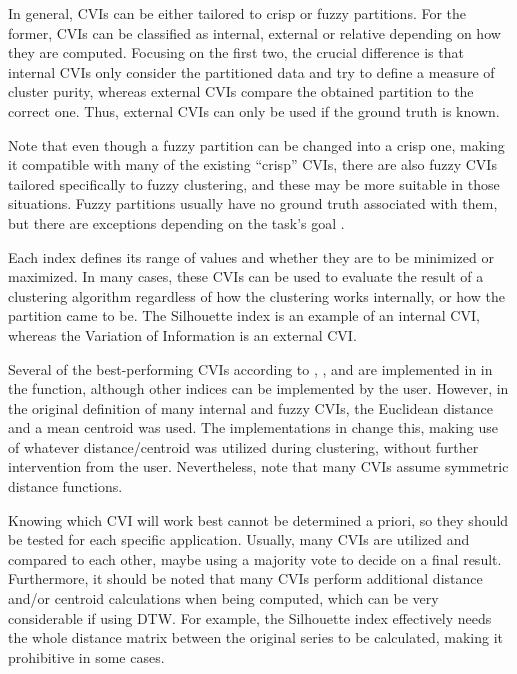 In general, CVIs can be either tailored to crisp or fuzzy partitions.
For the former,
CVIs can be classified as internal, external or relative depending on how they are computed.
Focusing on the first two,
the crucial difference is that internal CVIs only consider the partitioned data and try to define a measure of cluster purity,
whereas external CVIs compare the obtained partition to the correct one.
Thus, external CVIs can only be used if the ground truth is known.

Note that even though a fuzzy partition can be changed into a crisp one,
making it compatible with many of the existing ``crisp'' CVIs,
there are also fuzzy CVIs tailored specifically to fuzzy clustering,
and these may be more suitable in those situations.
Fuzzy partitions usually have no ground truth associated with them,
but there are exceptions depending on the task's goal \citep{lei2017}.

Each index defines its range of values and whether they are to be minimized or maximized.
In many cases,
these CVIs can be used to evaluate the result of a clustering algorithm regardless of how the clustering works internally,
or how the partition came to be.
The Silhouette index \citep{rousseeuw1987} is an example of an internal CVI,
whereas the Variation of Information \citep{meilua2003} is an external CVI.

Several of the best-performing CVIs according to \citet{wang2007}, \citet{arbelaitz2013}, and \cite{lei2017} are implemented in \dtwclust{} in the  function,
although other indices can be implemented by the user.
However, in the original definition of many internal and fuzzy CVIs,
the Euclidean distance and a mean centroid was used.
The implementations in \dtwclust{} change this,
making use of whatever distance/centroid was utilized during clustering,
without further intervention from the user.
Nevertheless, note that many CVIs assume symmetric distance functions.

Knowing which CVI will work best cannot be determined a priori,
so they should be tested for each specific application.
Usually, many CVIs are utilized and compared to each other,
maybe using a majority vote to decide on a final result.
Furthermore, it should be noted that many CVIs perform additional distance and/or centroid calculations when being computed,
which can be very considerable if using DTW.
For example, the Silhouette index effectively needs the whole distance matrix between the original series to be calculated,
making it prohibitive in some cases.

